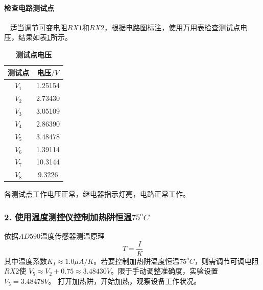 \documentclass[12pt,a4paper,UTF8]{ctexart}
\begin{document}
        \paragraph{检查电路测试点}~
        \newline
		\indent
        适当调节可变电阻$RX1$和$RX2$，根据电路图标注，使用万用表检查测试点电压，结果如表\ref{tab:1}所示。
        \begin{table}[htbp]
            \centering
                \begin{tabular}{cc}
                    \toprule
                    测试点	&电压$/V$  \\
                    \midrule
                    $V_1$	&1.25154	\\
                    $V_2$	&2.73430	\\
                    $V_3$	&3.05109	\\
                    $V_4$	&2.86390	\\
                    $V_5$	&3.48478	\\
                    $V_6$	&1.39114	\\
                    $V_7$	&10.3144	\\
                    $V_8$	&9.3226 	\\
                    \bottomrule
                \end{tabular}
                \caption{\textbf{测试点电压}}
                \label{tab:1}
        \end{table}
        各测试点工作电压正常，继电器指示灯亮，电路正常工作。

    \subsubsection*{2. 使用温度测控仪控制加热阱恒温$75^oC$}
    依据$AD590$温度传感器测温原理
    \begin{equation}
        T = \frac{I}{K}
    \end{equation}
    其中温度系数$K_I \approx 1.0 \mu A/K$。若要控制加热阱温度恒温$75^oC$，则需调节可调电阻$RX2$使
    $V_5 \approx V_2 + 0.75 \approx 3.48430 V$。限于手动调整准确度，实验设置$V_5 = 3.48478 V$。
    打开加热阱，开始加热，观察设备工作状况。
\end{document}
